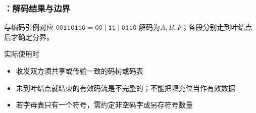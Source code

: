 \begin{frame}
    \frametitle{\insertsubsectionhead：解码结果与边界}
    \begin{exampleblock}{与编码引例对应}
        $\texttt{00110110}=\texttt{00}\mid\texttt{11}\mid\texttt{0110}$
        解码为$A,B,F$；各段分别走到叶结点后才确定分界。
    \end{exampleblock}
    \begin{block}{实际使用时}
        \begin{itemize}
            \item 收发双方须共享或传输一致的码树或码表
            \item 未到叶结点就结束的有效码流是不完整的；不能把填充位当作有效数据
            \item 若字母表只有一个符号，需约定非空码字或另存符号数量
        \end{itemize}
    \end{block}
\end{frame}
